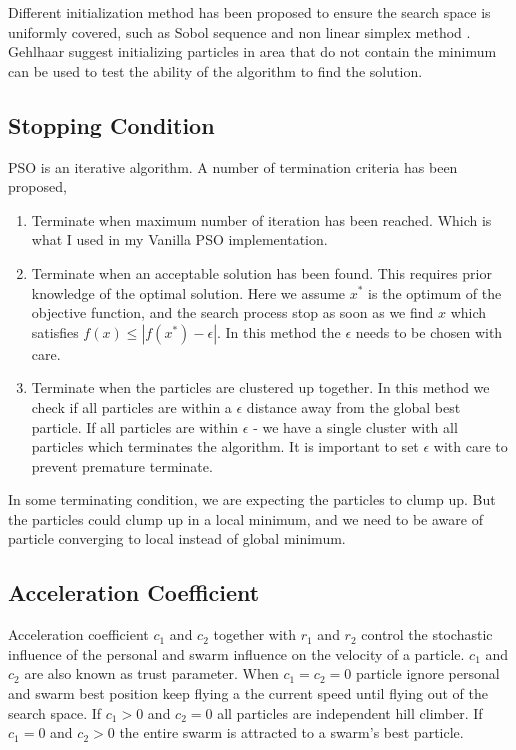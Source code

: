 \documentclass{article}
\begin{document}
Different initialization method has been proposed to ensure the search space is uniformly covered, such as Sobol sequence \cite{parsopoulos2002particle} and non linear simplex method \cite{parsopoulos2002initializing}. Gehlhaar suggest initializing particles in area that do not contain the minimum can be used to test the ability of the algorithm to find the solution.



\subsection{Stopping Condition}
PSO is an iterative algorithm. A number of termination criteria has been proposed,
\begin{enumerate}
    \item Terminate when maximum number of iteration has been reached. Which is what I used in my Vanilla PSO implementation.
    \item Terminate when an acceptable solution has been found. This requires prior knowledge of the optimal solution. Here we assume $x^*$ is the optimum of the objective function, and the search process stop as soon as we find $x$ which satisfies $f(x) \le |f(x^*) - \epsilon|$. In this method the $\epsilon$ needs to be chosen with care.
    \item Terminate when the particles are clustered up together. In this method we check if all particles are within a $\epsilon$ distance away from the global best particle. If all particles are within $\epsilon$ - we have a single cluster with all particles which terminates the algorithm. It is important to set $\epsilon$ with care to prevent premature terminate.
\end{enumerate}
In some terminating condition, we are expecting the particles to clump up. But the particles could clump up in a local minimum, and we need to be aware of particle converging to local instead of global minimum.



\subsection{Acceleration Coefficient}
Acceleration coefficient $c_1$ and $c_2$ together with $r_1$ and $r_2$ control the stochastic influence of the personal and swarm influence on the velocity of a particle. $c_1$ and $c_2$ are also known as trust parameter. When $c_1 = c_2 = 0$ particle ignore personal and swarm best position keep flying a the current speed until flying out of the search space. If $c_1 > 0$ and $c_2 = 0$ all particles are independent hill climber. If $c_1=0$ and $c_2 > 0$ the entire swarm is attracted to a swarm's best particle.
\end{document}
